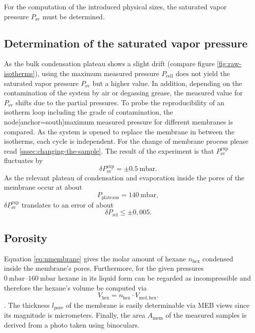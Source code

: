 \documentclass[../thesis.tex]{subfiles}
\begin{document}
        For the computation of the introduced physical sizes, the saturated vapor pressure $P_\mathrm{sv}$ must be determined.


        \subsection{Determination of the saturated vapor pressure}

            As the bulk condensation plateau shows a slight drift (compare figure \cref{fig:raw-isotherms}), using the maximum measured pressure $P_\mathrm{cell}$ does not yield the saturated vapor pressure $P_\mathrm{sv}$ but a higher value. In addition, depending on the contamination of the system by air or degassing grease, the measured value for $P_\mathrm{sv}$ shifts due to the partial pressures. To probe the reproducibility of an isotherm loop including the grade of contamination, the  node[anchor=south]maximum measured pressure for different membranes is compared. As the system is opened to replace the membrane in between the isotherms, each cycle is independent. For the change of membrane process please read \cref{sssec:changing-the-sample}. The result of the experiment is that $P_\mathrm{sv}^\mathrm{exp}$ fluctuates by
            \begin{equation}
                \delta P_\mathrm{sv}^\mathrm{exp} = \pm \SI{0,5}{\milli\bar}.
                \label{eq:delta-Psat}
            \end{equation}
            As the relevant plateau of condensation and evaporation inside the pores of the membrane occur at about
            \begin{equation}
                P_\mathrm{plateaus} = \SI{140}{\milli\bar},
            \end{equation}
            $\delta P_\mathrm{sv}^\mathrm{exp}$ translates to an error of about
            \begin{equation}
                \delta P_\mathrm{rel} \le \pm 0,005.
                \label{eq:delta-Prel}
            \end{equation}


        \subsection{Porosity}
        \label{subsec:porosity}

            Equation \cref{eq:nmembrane} gives the molar amount of hexane $n_\mathrm{hex}$ condensed inside the membrane's pores. Furthermore, for the given pressures $\SIrange{0}{160}{\milli\bar}$ hexane in its liquid form can be regarded as incompressible and therefore the hexane's volume be computed via
            \begin{equation*}
                V_\mathrm{hex} = n_\mathrm{hex} \cdot V_\mathrm{mol, hex}.
            \end{equation*}.
            The thickness $l_\mathrm{pore}$ of the membrane is easily determinable via MEB views since its magnitude is micrometers. Finally, the area $A_\mathrm{mem}$ of the measured samples is derived from a photo taken using binoculars.
\end{document}
